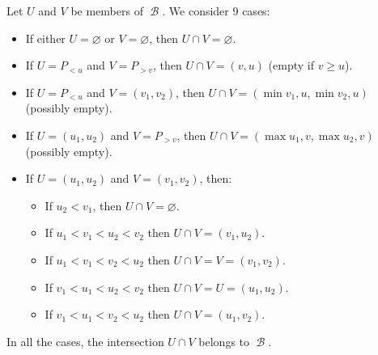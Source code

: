 \begin{defproof}
   Let \( U \) and \( V \) be members of \( \mscrB \). We consider \( 9 \) cases:
  \begin{itemize}
    \item If either \( U = \varnothing \) or \( V = \varnothing \), then \( U \cap V = \varnothing \).
    \item If \( U = P_{<u} \) and \( V = P_{>v} \), then \( U \cap V = (v, u) \) (empty if \( v \geq u \)).
    \item If \( U = P_{<u} \) and \( V = (v_1, v_2) \), then \( U \cap V = (\min{v_1, u}, \min{v_2, u}) \) (possibly empty).
    \item If \( U = (u_1, u_2) \) and \( V = P_{>v} \), then \( U \cap V = (\max{u_1, v}, \max{u_2, v}) \) (possibly empty).
    \item If \( U = (u_1, u_2) \) and \( V = (v_1, v_2) \), then:
    \begin{itemize}
      \item If \( u_2 < v_1 \), then \( U \cap V = \varnothing \).
      \item If \( u_1 < v_1 < u_2 < v_2 \) then \( U \cap V = (v_1, u_2) \).
      \item If \( u_1 < v_1 < v_2 < u_2 \) then \( U \cap V = V = (v_1, v_2) \).
      \item If \( v_1 < u_1 < u_2 < v_2 \) then \( U \cap V = U = (u_1, u_2) \).
      \item If \( v_1 < u_1 < v_2 < u_2 \) then \( U \cap V = (u_1, v_2) \).
    \end{itemize}
  \end{itemize}

  In all the cases, the intersection \( U \cap V \) belongs to \( \mscrB \).
\end{defproof}

